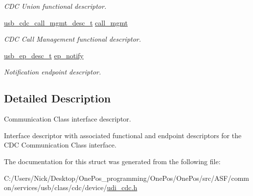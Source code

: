 \begin{DoxyCompactItemize}
\begin{DoxyCompactList}\small\item\em C\-D\-C Union functional descriptor. \end{DoxyCompactList}\item 
\hypertarget{structudi__cdc__comm__desc__t_afb9b650303cb414e51b404788fa2eb4e}{\hyperlink{structusb__cdc__call__mgmt__desc__t}{usb\-\_\-cdc\-\_\-call\-\_\-mgmt\-\_\-desc\-\_\-t} \hyperlink{structudi__cdc__comm__desc__t_afb9b650303cb414e51b404788fa2eb4e}{call\-\_\-mgmt}}\label{structudi__cdc__comm__desc__t_afb9b650303cb414e51b404788fa2eb4e}

\begin{DoxyCompactList}\small\item\em C\-D\-C Call Management functional descriptor. \end{DoxyCompactList}\item 
\hypertarget{structudi__cdc__comm__desc__t_ae4f839a855f80e1942ae1de4cd5562d3}{\hyperlink{structusb__ep__desc__t}{usb\-\_\-ep\-\_\-desc\-\_\-t} \hyperlink{structudi__cdc__comm__desc__t_ae4f839a855f80e1942ae1de4cd5562d3}{ep\-\_\-notify}}\label{structudi__cdc__comm__desc__t_ae4f839a855f80e1942ae1de4cd5562d3}

\begin{DoxyCompactList}\small\item\em Notification endpoint descriptor. \end{DoxyCompactList}\end{DoxyCompactItemize}


\subsection{Detailed Description}
Communication Class interface descriptor. 

Interface descriptor with associated functional and endpoint descriptors for the C\-D\-C Communication Class interface. 

The documentation for this struct was generated from the following file\-:\begin{DoxyCompactItemize}
\item 
C\-:/\-Users/\-Nick/\-Desktop/\-One\-Pos\-\_\-programming/\-One\-Pos/\-One\-Pos/src/\-A\-S\-F/common/services/usb/class/cdc/device/\hyperlink{udi__cdc_8h}{udi\-\_\-cdc.\-h}\end{DoxyCompactItemize}
